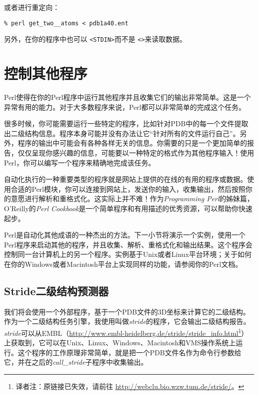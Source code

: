 或者进行重定向：

\begin{lstlisting}
% perl get_two__atoms < pdb1a40.ent 
\end{lstlisting}

另外，在你的程序中也可以 \verb|<STDIN>|而不是 \verb|<>|来读取数据。

\section{控制其他程序}
Perl使得在你的Perl程序中运行其他程序并且收集它们的输出非常简单。这是一个异常有用的能力。对于大多数程序来说，Perl都可以非常简单的完成这个任务。

很多时候，你可能需要运行一些特定的程序，比如针对PDB中的每一个文件提取出二级结构信息。程序本身可能并没有办法让它“针对所有的文件运行自己”。另外，程序的输出中可能会有各种各样无关的信息。你需要的只是一个更加简单的报告，仅仅呈现你感兴趣的信息，可能要以一种特定的格式作为其他程序输入！使用Perl，你可以编写一个程序来精确地完成该任务。

自动化执行的一种重要类型的程序就是网站上提供的在线的有用的程序或数据。使用合适的Perl模块，你可以连接到网站上，发送你的输入，收集输出，然后按照你的意愿进行解析和重格式化。这实际上并不难！作为\textit{Programming Perl}的姊妹篇，O'Reilly的\textit{Perl Cookbook}是一个简单程序和有用描述的优秀资源，可以帮助你快速起步。

Perl是自动化其他成语的一种杰出的方法。下一小节将演示一个实例，使用一个Perl程序来启动其他的程序，并且收集、解析、重格式化和输出结果。这个程序会控制同一台计算机上的另一个程序。实例基于Unix或者Linux平台环境；关于如何在你的Windows或者Macintosh平台上实现同样的功能，请参阅你的Perl文档。

\subsection{Stride二级结构预测器}
我们将会使用一个外部程序，基于一个PDB文件的3D坐标来计算它的二级结构。作为一个二级结构任务引擎，我使用叫做\textit{stride}的程序，它会输出二级结构报告。\textit{stride}可以从EMBL（\href{http://www.embl-heidelberg.de/stride/stride\_info.html}{http://www.embl-heidelberg.de/stride/stride\_info.html}\footnote{译者注：原链接已失效，请前往 \href{http://webclu.bio.wzw.tum.de/stride/}{http://webclu.bio.wzw.tum.de/stride/}。}）上获取到，它可以在Unix、Linux、Windows、Macintosh和VMS操作系统上运行。这个程序的工作原理非常简单，就是把一个PDB文件名作为命令行参数给它，并在之后的\textit{call\_stride}子程序中收集输出。


